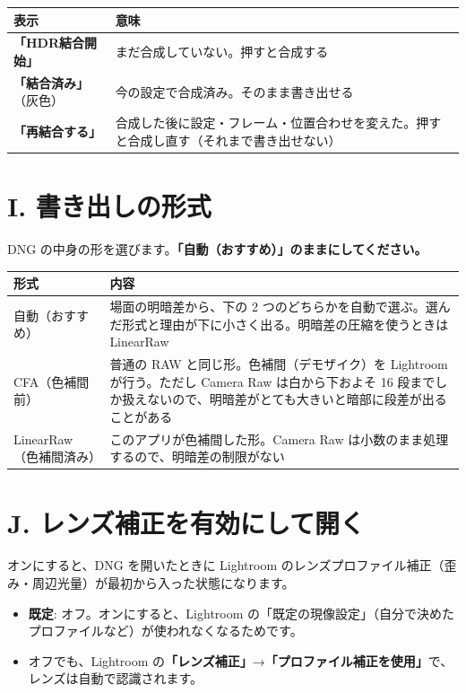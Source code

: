\documentclass[paper=a4paper,fontsize=11pt,report,jafontsize=11pt]{jlreq}
\newcommand{\ui}[1]{\textsf{\textbf{「#1」}}}
\begin{document}
\noindent\begin{tabularx}{\linewidth}{l X}
\toprule
表示 & 意味 \\ \midrule
\ui{HDR結合開始} & まだ合成していない。押すと合成する \\
\ui{結合済み}（灰色） & 今の設定で合成済み。そのまま書き出せる \\
\ui{再結合する} & 合成した後に設定・フレーム・位置合わせを変えた。押すと合成し直す（それまで書き出せない） \\
\bottomrule
\end{tabularx}

\section{I. 書き出しの形式}
DNG の中身の形を選びます。\textbf{\ui{自動（おすすめ）}のままにしてください。}

\noindent\begin{tabularx}{\linewidth}{l X}
\toprule
形式 & 内容 \\ \midrule
自動（おすすめ） & 場面の明暗差から、下の 2 つのどちらかを自動で選ぶ。選んだ形式と理由が下に小さく出る。明暗差の圧縮を使うときは LinearRaw \\
CFA（色補間前） & 普通の RAW と同じ形。色補間（デモザイク）を Lightroom が行う。ただし Camera Raw は白から下およそ 16 段までしか扱えないので、明暗差がとても大きいと暗部に段差が出ることがある \\
LinearRaw（色補間済み） & このアプリが色補間した形。Camera Raw は小数のまま処理するので、明暗差の制限がない \\
\bottomrule
\end{tabularx}

\section{J. レンズ補正を有効にして開く}
オンにすると、DNG を開いたときに Lightroom のレンズプロファイル補正（歪み・周辺光量）が最初から入った状態になります。
\begin{itemize}
  \item \textbf{既定}: オフ。オンにすると、Lightroom の「既定の現像設定」（自分で決めたプロファイルなど）が使われなくなるためです。
  \item オフでも、Lightroom の\ui{レンズ補正}→\ui{プロファイル補正を使用}で、レンズは自動で認識されます。
\end{itemize}
\end{document}

